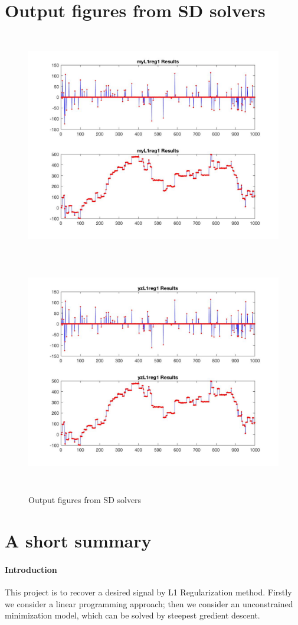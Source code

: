 \section*{Output figures from SD solvers}
\begin{figure}[H]
\centering
\includegraphics[height=10cm]{Output_4}
\includegraphics[height=10cm]{Output_3}
\caption{Output figures from SD solvers}
\end{figure}

\clearpage
\section*{A short summary}
\paragraph{Introduction}
This project is to recover a desired signal by L1 Regularization method. Firstly we consider a linear programming approach; then we consider an unconstrained minimization model, which can be solved by steepest gredient descent.

